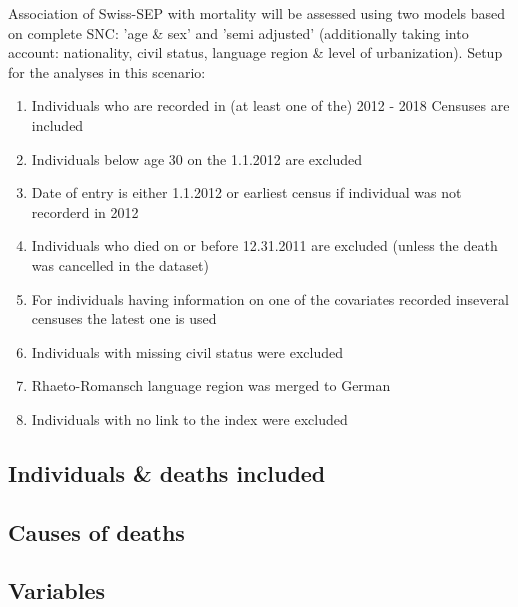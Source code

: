 \documentclass[a4paper, notitlepage, fleqn]{article} %
\begin{document}
Association of Swiss-SEP with mortality will be assessed using two models based on complete SNC: 
'age \& sex' and 'semi adjusted'  
(additionally taking into account: nationality, civil status, language region \& level of urbanization). Setup for the analyses in this scenario: 
\begin{enumerate}

	\item Individuals who are recorded in (at least one of the) 2012 - 2018 Censuses are included
	\item Individuals below age 30 on the 1.1.2012 are excluded
	\item Date of entry is either 1.1.2012 or earliest census if individual was not recorderd in 2012
	\item Individuals who died on or before 12.31.2011 are excluded (unless the death was cancelled in the dataset)
	\item For individuals having information on one of the covariates recorded inseveral censuses the latest one is used
	\item Individuals with missing civil status were excluded
	\item Rhaeto-Romansch language region was merged to German
	\item Individuals with no link to the index were excluded
	
\end{enumerate}

\subsection{Individuals \& deaths included}
\begin{stlog}\end{stlog}
\subsection{Causes of deaths}
\begin{stlog}\end{stlog}
\subsection{Variables}
\begin{stlog}\end{stlog}
\end{document}
